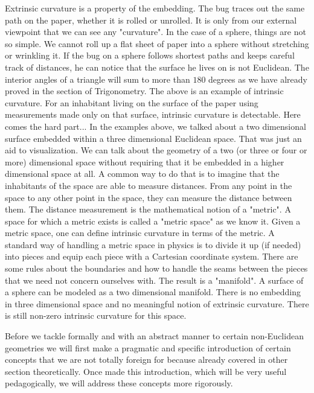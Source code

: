 	 Extrinsic curvature is a property of the embedding. The bug traces out the same path on the paper, whether it is rolled or unrolled. It is only from our external viewpoint that we can see any "curvature". In the case of a sphere, things are not so simple. We cannot roll up a flat sheet of paper into a sphere without stretching or wrinkling it. If the bug on a sphere follows shortest paths and keeps careful track of distances, he can notice that the surface he lives on is not Euclidean. The interior angles of a triangle will sum to more than $180$ degrees as we have already proved in the section of Trigonometry. The above is an example of intrinsic curvature. For an inhabitant living on the surface of the paper using measurements made only on that surface, intrinsic curvature is detectable. Here comes the hard part... In the examples above, we talked about a two dimensional surface embedded within a three dimensional Euclidean space. That was just an aid to visualization. We can talk about the geometry of a two (or three or four or more) dimensional space without requiring that it be embedded in a higher dimensional space at all. A common way to do that is to imagine that the inhabitants of the space are able to measure distances. From any point in the space to any other point in the space, they can measure the distance between them. The distance measurement is the mathematical notion of a "metric". A space for which a metric exists is called a "metric space" as we know it. Given a metric space, one can define intrinsic curvature in terms of the metric. A standard way of handling a metric space in physics is to divide it up (if needed) into pieces and equip each piece with a Cartesian coordinate system. There are some rules about the boundaries and how to handle the seams between the pieces that we need not concern ourselves with. The result is a "manifold". A surface of a sphere can be modeled as a two dimensional manifold. There is no embedding in three dimensional space and no meaningful notion of extrinsic curvature. There is still non-zero intrinsic curvature for this space.
	
	Before we tackle formally and with an abstract manner to certain non-Euclidean geometries we will first make a pragmatic and specific introduction of certain concepts that we are not totally foreign for because already covered in other section theoretically. Once made this introduction, which will be very useful pedagogically, we will address these concepts more rigorously.
	
